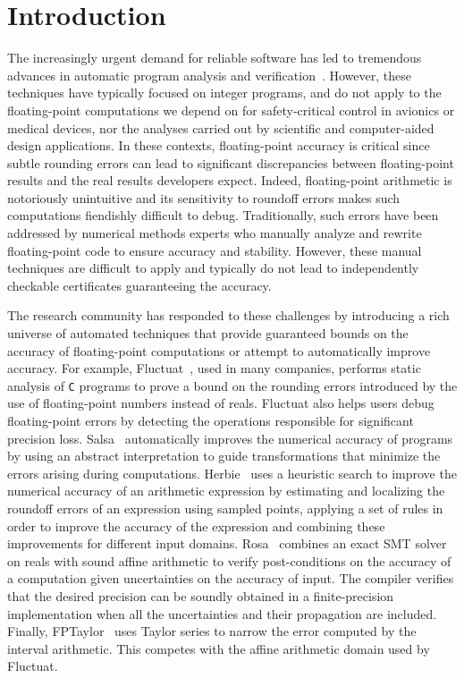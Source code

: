\documentclass[main.tex]{subfiles}
\begin{document}
\section{Introduction}
\label{sec:intro}

The increasingly urgent demand for reliable software has led to tremendous
advances in automatic program analysis and verification~\cite{cbmc,astree,klee,coverity,mars-code}.
However, these techniques have typically focused on integer programs, and do
not apply to the floating-point computations we depend on for
safety-critical control in avionics or medical devices, nor the analyses
carried out by scientific and computer-aided design applications.  In these
contexts, floating-point accuracy is critical since subtle rounding errors
can lead to significant discrepancies between floating-point results and
the real results developers expect.  Indeed, floating-point
arithmetic is notoriously unintuitive and its sensitivity to roundoff
errors makes such computations fiendishly difficult to debug.
Traditionally, such errors have been addressed by numerical methods experts
who manually analyze and rewrite floating-point code to ensure accuracy and
stability.  However, these manual techniques are difficult to apply and
typically do not lead to independently checkable certificates guaranteeing
the accuracy.

The research community has responded to these challenges by introducing
a rich universe of automated techniques that provide guaranteed bounds on the
accuracy of floating-point computations or attempt to automatically improve
accuracy.  For example, Fluctuat~\cite{Goubault13,GMP06}, used in
many companies, performs static analysis of \texttt{C} programs to prove
a bound on the rounding errors introduced by the use of
floating-point numbers instead of reals.  Fluctuat also helps users
debug floating-point errors by detecting the operations responsible for
significant precision loss.  Salsa~\cite{fmics15} automatically improves
the numerical accuracy of programs by using an abstract interpretation to
guide transformations that minimize the errors arising during
computations.  Herbie~\cite{pavel15} uses a heuristic search to improve the numerical
accuracy of an arithmetic expression by estimating and
localizing the roundoff errors of an expression using sampled points,
applying a set of rules in order to improve the accuracy of the expression
and combining these improvements for different input domains.
Rosa~\cite{DarulovaK14} combines
an exact SMT solver on reals with sound affine arithmetic to verify
post-conditions on the accuracy of a computation
given uncertainties on the accuracy of input.  The compiler verifies that the desired precision
can be soundly obtained in a finite-precision implementation when all the
uncertainties and their propagation are included.  Finally,
FPTaylor~\cite{fptaylor-fm15} uses Taylor series to narrow
the error computed by the interval arithmetic.  This competes with the
affine arithmetic domain used by Fluctuat.
\end{document}
